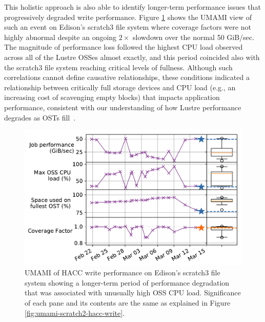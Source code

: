 This holistic approach is also able to identify longer-term performance issues that progressively degraded write performance.
Figure \ref{fig:umami-scratch3-hacc-write-long-term} shows the UMAMI view of such an event on Edison's scratch3 file system where coverage factors were not highly abnormal despite an ongoing $2\times$ slowdown over the normal 50 GiB/sec.
The magnitude of performance loss followed the highest CPU load observed across all of the Lustre OSSes almost exactly, and this period coincided also with the scratch3 file system reaching critical levels of fullness.
Although such correlations cannot define causative relationships, these conditions indicated a relationship between critically full storage devices and CPU load (e.g., an increasing cost of scavenging empty blocks) that impacts application performance, consistent with our understanding of how Lustre performance degrades as OSTs fill~\cite{oral2014best}.
 
\begin{figure}[t]
    \centering
    \includegraphics[width=1.0\columnwidth]{figs/umami-scratch3-hacc-write-long-term.pdf}
    \caption{UMAMI of HACC write performance on Edison's scratch3 file system showing a longer-term period of performance degradation that was associated with unusually high OSS CPU load.
    Significance of each pane and its contents are the same as explained in Figure \ref{fig:umami-scratch2-hacc-write}.}
    \label{fig:umami-scratch3-hacc-write-long-term}
\vspace{-.2in}
\end{figure}

